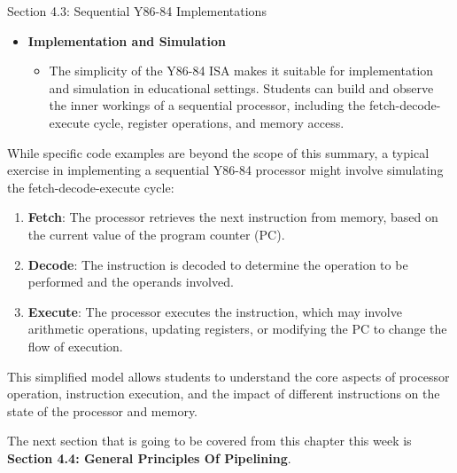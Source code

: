 \begin{notes}{Section 4.3: Sequential Y86-84 Implementations}
\begin{itemize}
\begin{itemize}
            creating dynamic and functional programs within the Y86-84 architecture.
        \end{itemize}
        \item \textbf{Implementation and Simulation}
        \begin{itemize}
            \item The simplicity of the Y86-84 ISA makes it suitable for implementation and simulation in educational settings. Students can build and observe the inner workings of a sequential 
            processor, including the fetch-decode-execute cycle, register operations, and memory access.
        \end{itemize}
    \end{itemize}
    
    \begin{highlight}
        While specific code examples are beyond the scope of this summary, a typical exercise in implementing a sequential Y86-84 processor might involve simulating the fetch-decode-execute cycle:

        \begin{enumerate}
            \item \textbf{Fetch}: The processor retrieves the next instruction from memory, based on the current value of the program counter (PC).
            \item \textbf{Decode}: The instruction is decoded to determine the operation to be performed and the operands involved.
            \item \textbf{Execute}: The processor executes the instruction, which may involve arithmetic operations, updating registers, or modifying the PC to change the flow of execution.
        \end{enumerate}
    
        This simplified model allows students to understand the core aspects of processor operation, instruction execution, and the impact of different instructions on the state of the processor and memory.
    \end{highlight}    
\end{notes}

The next section that is going to be covered from this chapter this week is \textbf{Section 4.4: General Principles Of Pipelining}.

